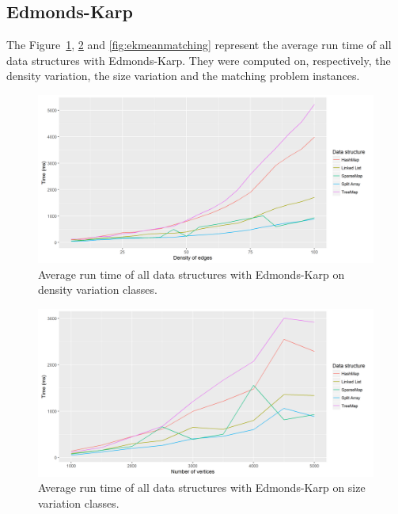\subsection{Edmonds-Karp}
The Figure~\ref{fig:ekmeandensity}, \ref{fig:ekmeansize} and \ref{fig:ekmeanmatching} represent the average run time of all data structures with Edmonds-Karp. They were computed on, respectively, the density variation, the size variation and the matching problem instances.
\begin{figure}[H]
\begin{center}
\includegraphics[scale=0.54]{images/results/ekmeandensity.png}
\caption{Average run time of all data structures with Edmonds-Karp on density variation classes.}
\label{fig:ekmeandensity}
\end{center}
\end{figure}
\begin{figure}[H]
\begin{center}
\includegraphics[scale=0.54]{images/results/ekmeansize.png}
\caption{Average run time of all data structures with Edmonds-Karp on size variation classes.}
\label{fig:ekmeansize}
\end{center}
\end{figure}
